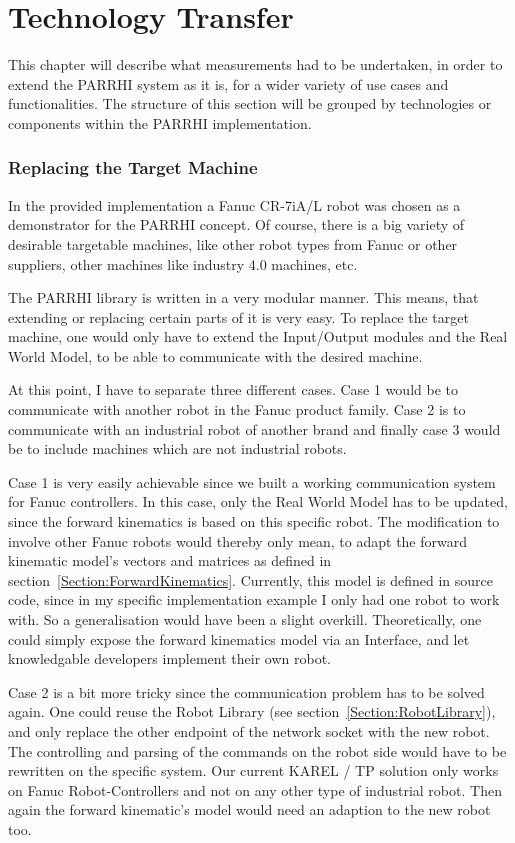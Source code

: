 \chapter{Technology Transfer}
\label{Chap:TechnologyTransfer}
\label{Section:TechnologyTransfer}

This chapter will describe what measurements had to be undertaken, in order to extend the PARRHI system as it is, for a wider variety of use cases and functionalities. The structure of this section will be grouped by technologies or components within the PARRHI implementation.

\subsection{Replacing the Target Machine}
In the provided implementation a Fanuc CR-7iA/L robot was chosen as a demonstrator for the PARRHI concept. Of course, there is a big variety of desirable targetable machines, like other robot types from Fanuc or other suppliers, other machines like industry 4.0 machines, etc.

The PARRHI library is written in a very modular manner. This means, that extending or replacing certain parts of it is very easy. To replace the target machine, one would only have to extend the Input/Output modules and the Real World Model, to be able to communicate with the desired machine.

At this point, I have to separate three different cases. Case 1 would be to communicate with another robot in the Fanuc product family. Case 2 is to communicate with an industrial robot of another brand and finally case 3 would be to include machines which are not industrial robots. 

Case 1 is very easily achievable since we built a working communication system for Fanuc controllers. In this case, only the Real World Model has to be updated, since the forward kinematics is based on this specific robot. The modification to involve other Fanuc robots would thereby only mean, to adapt the forward kinematic model's vectors and matrices as defined in section~\ref{Section:ForwardKinematics}. Currently, this model is defined in source code, since in my specific implementation example I only had one robot to work with. So a generalisation would have been a slight overkill. Theoretically, one could simply expose the forward kinematics model via an Interface, and let knowledgable developers implement their own robot. 

Case 2 is a bit more tricky since the communication problem has to be solved again. One could reuse the Robot Library (see section~\ref{Section:RobotLibrary}), and only replace the other endpoint of the network socket with the new robot. The controlling and parsing of the commands on the robot side would have to be rewritten on the specific system. Our current KAREL / TP solution only works on Fanuc Robot-Controllers and not on any other type of industrial robot. Then again the forward kinematic's model would need an adaption to the new robot too.

